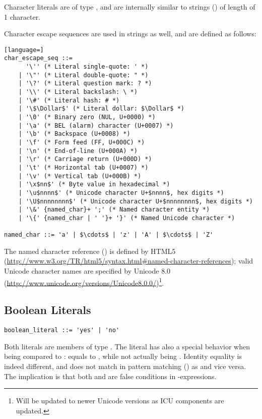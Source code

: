 Character literals are of type , and are internally similar to strings () of length of 1 character. 

Character escape sequences are used in strings as well, and are defined as follows: 

\syntax\begin{lstlisting}[language=]
char_escape_seq ::= 
      '\'' (* Literal single-quote: ' *)
    | '\"' (* Literal double-quote: " *)
    | '\?' (* Literal question mark: ? *)
    | '\\' (* Literal backslash: \ *)
    | '\#' (* Literal hash: # *)
    | '\$\Dollar$' (* Literal dollar: $\Dollar$ *)
    | '\0' (* Binary zero (NUL, U+0000) *)
    | '\a' (* BEL (alarm) character (U+0007) *)
    | '\b' (* Backspace (U+0008) *)
    | '\f' (* Form feed (FF, U+000C) *)
    | '\n' (* End-of-line (U+000A) *)
    | '\r' (* Carriage return (U+000D) *)
    | '\t' (* Horizontal tab (U+0007) *)
    | '\v' (* Vertical tab (U+000B) *)
    | '\x$nn$' (* Byte value in hexadecimal *)
    | '\u$nnnn$' (* Unicode character U+$nnnn$, hex digits *)
    | '\U$nnnnnnnn$' (* Unicode character U+$nnnnnnnn$, hex digits *)
    | '\&' {named_char}+ ';' (* Named character entity *)
    | '\{' {named_char | ' '}+ '}' (* Named Unicode character *)
      
named_char ::= 'a' | $\cdots$ | 'z' | 'A' | $\cdots$ | 'Z'
\end{lstlisting}

The named character reference () is defined by HTML5 (\url{http://www.w3.org/TR/html5/syntax.html#named-character-references}); valid Unicode character names are specified by Unicode 8.0 (\url{http://www.unicode.org/versions/Unicode8.0.0/})\footnote{Will be updated to newer Unicode versions as ICU components are updated.}. 





\subsection{Boolean Literals}
\label{sec:booleanliterals}

\syntax\begin{lstlisting}
boolean_literal ::= 'yes' | 'no'
\end{lstlisting}

Both literals are members of type \lstinline@Boolean@. The \lstinline@no@ literal has also a special behavior when being compared to \lstinline@nil@: \lstinline@no@ equals to \lstinline@nil@, while not actually being \lstinline@nil@. Identity equality is indeed different, and  does not match in pattern matching () as  and vice versa. The implication is that both \lstinline@nil@ and \lstinline@no@ are false conditions in \lstinline@if@-expressions. 





